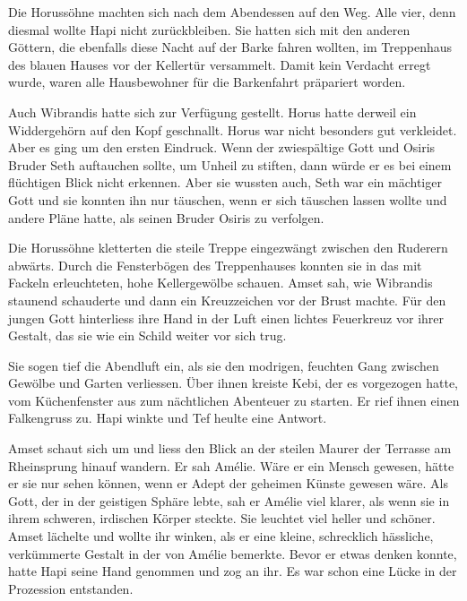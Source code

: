 \documentclass[11pt,titlepage,a5paper]{book}
\begin{document}
Die Horussöhne machten sich nach dem Abendessen auf den Weg. Alle vier, denn diesmal wollte Hapi nicht zurückbleiben. Sie hatten sich mit den anderen Göttern, die ebenfalls diese Nacht auf der Barke fahren wollten, im Treppenhaus des blauen Hauses vor der Kellertür versammelt. Damit kein Verdacht erregt wurde, waren alle Hausbewohner für die Barkenfahrt präpariert worden.

Auch Wibrandis hatte sich zur Verfügung gestellt. Horus hatte derweil ein Widdergehörn auf den Kopf geschnallt. Horus war nicht besonders gut verkleidet. Aber es ging um den ersten Eindruck. Wenn der zwiespältige Gott und Osiris Bruder Seth auftauchen sollte, um Unheil zu stiften, dann würde er es bei einem flüchtigen Blick nicht erkennen. Aber sie wussten auch, Seth war ein mächtiger Gott und sie konnten ihn nur täuschen, wenn er sich täuschen lassen wollte und andere Pläne hatte, als seinen Bruder Osiris zu verfolgen.

Die Horussöhne kletterten die steile Treppe eingezwängt zwischen den Ruderern abwärts. Durch die Fensterbögen des Treppenhauses konnten sie in das mit Fackeln erleuchteten, hohe Kellergewölbe schauen. Amset sah, wie Wibrandis staunend schauderte und dann ein Kreuzzeichen vor der Brust machte. Für den jungen Gott hinterliess ihre Hand in der Luft einen lichtes Feuerkreuz vor ihrer Gestalt, das sie wie ein Schild weiter vor sich trug.

Sie sogen tief die Abendluft ein, als sie den modrigen, feuchten Gang zwischen Gewölbe und Garten verliessen. Über ihnen kreiste Kebi, der es vorgezogen hatte, vom Küchenfenster aus zum nächtlichen Abenteuer zu starten. Er rief ihnen einen Falkengruss zu. Hapi winkte und Tef heulte eine Antwort. 

Amset schaut sich um und liess den Blick an der steilen Maurer der Terrasse am Rheinsprung hinauf wandern. Er sah Amélie. Wäre er ein Mensch gewesen, hätte er sie nur sehen können, wenn er Adept der geheimen Künste gewesen wäre. Als Gott, der in der geistigen Sphäre lebte, sah er Amélie viel klarer, als wenn sie in ihrem schweren, irdischen Körper steckte. Sie leuchtet viel heller und schöner. Amset lächelte und wollte ihr winken, als er eine kleine, schrecklich hässliche, verkümmerte Gestalt in der von Amélie bemerkte. Bevor er etwas denken konnte, hatte Hapi seine Hand genommen und zog an ihr. Es war schon eine Lücke in der Prozession entstanden.
\end{document}
